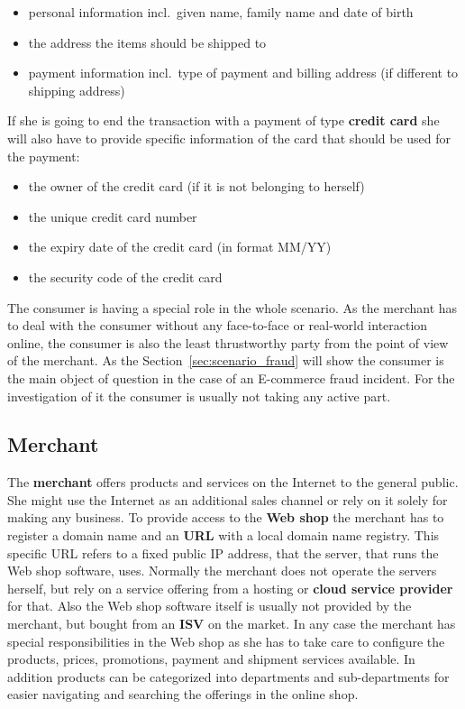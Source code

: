 \begin{itemize}
		\item personal information incl.\ given name, family name and date of birth
		\item the address the items should be shipped to
		\item payment information incl.\ type of payment and billing address (if different to shipping address)
\end{itemize}

If she is going to end the transaction with a payment of type \textbf{credit card} she will also have to provide specific information of the card that should  be used for the payment:\@

\begin{itemize}
		\item the owner of the credit card (if it is not belonging to herself)
		\item the unique credit card number
		\item the expiry date of the credit card (in format MM/YY)
		\item the security code of the credit card
\end{itemize}

The consumer is having a special role in the whole scenario. As the merchant has to deal with the consumer without any face-to-face or real-world interaction online, the consumer is also the least thrustworthy party from the point of view of the merchant. As the Section~\ref{sec:scenario_fraud} will show the consumer is the main object of question in the case of an E-commerce fraud incident. For the investigation of it the consumer is usually not taking any active part.


\subsection{Merchant}
\label{subsec:stakeholder_merchant}

The \textbf{merchant} offers products and services on the Internet to the general public. She might use the Internet as an additional sales channel or rely on it solely for making any business. To provide access to the \textbf{Web shop} the merchant has to register a domain name and an \textbf{\gls{URL}} with a local domain name registry. This specific \gls{URL} refers to a fixed public \gls{IP} address, that the server, that runs the Web shop software, uses. Normally the merchant does not operate the servers herself, but rely on a service offering from a hosting or \textbf{cloud service provider} for that. Also the Web shop software itself is usually not provided by the merchant, but bought from an \textbf{\gls{ISV}} on the market. In any case the merchant has special responsibilities in the Web shop as she has to take care to configure the products, prices, promotions, payment and shipment services available. In addition products can be categorized into departments and sub-departments for easier navigating and searching the offerings in the online shop. \\

